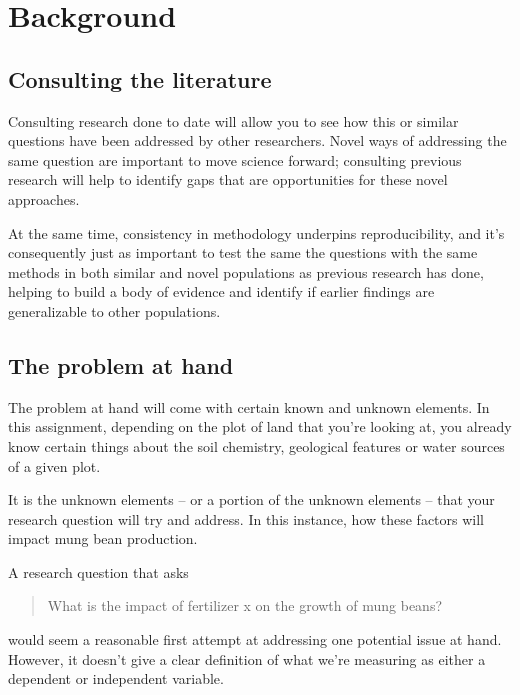 \documentclass[
]{book}
\begin{document}
\hypertarget{background}{%
\section*{Background}\label{background}}

\hypertarget{consulting-the-literature}{%
\subsection*{Consulting the literature}\label{consulting-the-literature}}

Consulting research done to date will allow you to see how this or similar questions have been addressed by other researchers. Novel ways of addressing the same question are important to move science forward; consulting previous research will help to identify gaps that are opportunities for these novel approaches.

At the same time, consistency in methodology underpins reproducibility, and it's consequently just as important to test the same the questions with the same methods in both similar and novel populations as previous research has done, helping to build a body of evidence and identify if earlier findings are generalizable to other populations.

\hypertarget{the-problem-at-hand}{%
\subsection*{The problem at hand}\label{the-problem-at-hand}}

The problem at hand will come with certain known and unknown elements. In this assignment, depending on the plot of land that you're looking at, you already know certain things about the soil chemistry, geological features or water sources of a given plot.

It is the unknown elements -- or a portion of the unknown elements -- that your research question will try and address. In this instance, how these factors will impact mung bean production.

A research question that asks

\begin{quote}
What is the impact of fertilizer x on the growth of mung beans?
\end{quote}

would seem a reasonable first attempt at addressing one potential issue at hand. However, it doesn't give a clear definition of what we're measuring as either a dependent or independent variable.
\end{document}
